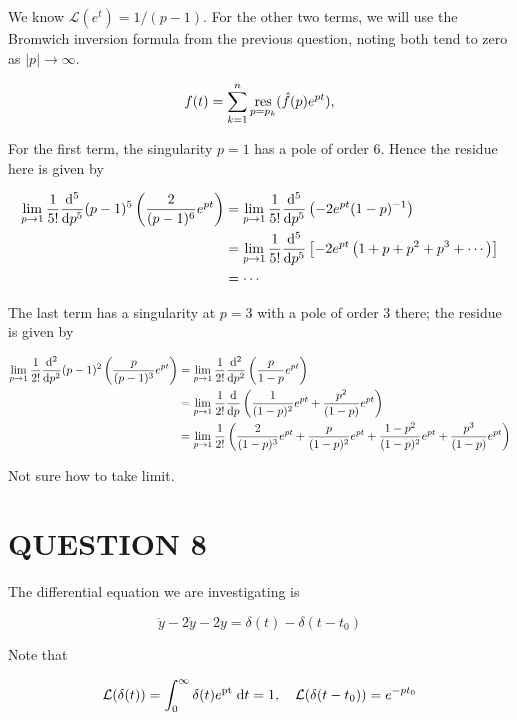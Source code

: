 \documentclass[a4paper]{article}
\begin{document}
We know $ \mathcal{L}(e^{t}) = 1/(p-1) $. For the other two terms, we will use the Bromwich inversion formula from the previous question, noting both tend to zero as $ | p | \to \infty $. 

\[
f(t) = \sum_{k = 1}^n \operatorname*{res}_{p = p_k} (\hat{f}(p) e^{pt}),
\]

For the first term, the singularity $ p = 1 $ has a pole of order 6. Hence the residue here is given by

\begin{align*}
\lim_{p \to 1}\frac{1}{5!}  \frac{\mathrm{d}^{5}}{\mathrm{d} p^{5}} (p-1)^{5} \left( \frac{2}{(p-1)^{6}} e^{pt} \right) & = \lim_{p \to 1} \frac{1}{5!}  \frac{\mathrm{d}^{5}}{\mathrm{d} p^{5}}\left( -2e^{pt}(1-p)^{-1}\right) \\
& = \lim_{p \to 1} \frac{1}{5!} \frac{\mathrm{d}^{5}}{\mathrm{d} p^{5}} \left[ -2 e^{pt} \left( 1 + p + p^{2} + p^{3} + \cdots   \right) \right]  \\
& = \cdots
\end{align*}

The last term has a singularity at $ p = 3 $ with a pole of order $ 3 $ there; the residue is given by 

\begin{align*}
\lim_{p \to 1}\frac{1}{2!}  \frac{\mathrm{d}^{2}}{\mathrm{d} p^{2}} (p-1)^{2} \left( \frac{p}{(p-1)^{3}} e^{pt} \right) & = \lim_{p \to 1}\frac{1}{2!}  \frac{\mathrm{d}^{2}}{\mathrm{d} p^{2}}  \left( \frac{p}{1-p} e^{pt} \right) \\
& = \lim_{p \to 1}\frac{1}{2!}  \frac{\mathrm{d}}{\mathrm{d} p}  \left( \frac{1}{(1-p)^{2}} e^{pt} + \frac{p^{2}}{(1-p)} e^{pt} \right) \\
& = \lim_{p \to 1}\frac{1}{2!} \left( \frac{2}{(1-p)^{3}} e^{pt} + \frac{p}{(1-p)^{2}} e^{pt} + \frac{1-p^{2}}{(1-p)^{2}} e^{pt} + \frac{p^{3}}{(1-p)} e^{pt} \right)
\end{align*}

Not sure how to take limit.



\section{QUESTION 8}

The differential equation we are investigating is

\[ \ddot{y} - 2 \dot{y} - 2 y = \delta(t) - \delta(t - t_{0}) \]

Note that

\[ \mathcal{L}(\delta(t)) = \int_{0}^{\infty} \delta(t) e^{\mathrm{pt}} \; \mathrm{d} t = 1, \quad \mathcal{L}(\delta(t-t_{0})) = e^{-pt_{0}} \]
\end{document}
